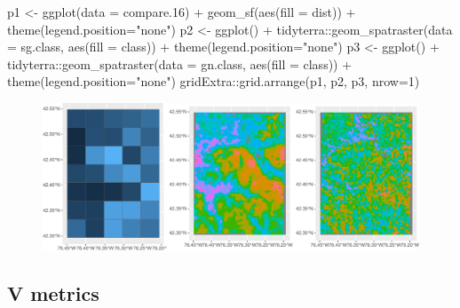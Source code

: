 \documentclass[
  letterpaper,
  DIV=11,
  numbers=noendperiod]{scrartcl}
\newenvironment{Shaded}{\begin{snugshade}}{\end{snugshade}}
\newcommand{\AttributeTok}[1]{\textcolor[rgb]{0.40,0.45,0.13}{#1}}
\newcommand{\DecValTok}[1]{\textcolor[rgb]{0.68,0.00,0.00}{#1}}
\newcommand{\FloatTok}[1]{\textcolor[rgb]{0.68,0.00,0.00}{#1}}
\newcommand{\FunctionTok}[1]{\textcolor[rgb]{0.28,0.35,0.67}{#1}}
\newcommand{\NormalTok}[1]{\textcolor[rgb]{0.00,0.23,0.31}{#1}}
\newcommand{\OtherTok}[1]{\textcolor[rgb]{0.00,0.23,0.31}{#1}}
\newcommand{\SpecialCharTok}[1]{\textcolor[rgb]{0.37,0.37,0.37}{#1}}
\newcommand{\StringTok}[1]{\textcolor[rgb]{0.13,0.47,0.30}{#1}}
\begin{document}
\begin{Shaded}
\begin{Highlighting}[]
\NormalTok{p1 }\OtherTok{\textless{}{-}} \FunctionTok{ggplot}\NormalTok{(}\AttributeTok{data =}\NormalTok{ compare}\FloatTok{.16}\NormalTok{) }\SpecialCharTok{+} 
    \FunctionTok{geom\_sf}\NormalTok{(}\FunctionTok{aes}\NormalTok{(}\AttributeTok{fill =}\NormalTok{ dist))  }\SpecialCharTok{+}
   \FunctionTok{theme}\NormalTok{(}\AttributeTok{legend.position=}\StringTok{"none"}\NormalTok{)}
\NormalTok{p2 }\OtherTok{\textless{}{-}} \FunctionTok{ggplot}\NormalTok{() }\SpecialCharTok{+}
\NormalTok{  tidyterra}\SpecialCharTok{::}\FunctionTok{geom\_spatraster}\NormalTok{(}\AttributeTok{data =}\NormalTok{ sg.class, }\FunctionTok{aes}\NormalTok{(}\AttributeTok{fill =}\NormalTok{ class)) }\SpecialCharTok{+}
   \FunctionTok{theme}\NormalTok{(}\AttributeTok{legend.position=}\StringTok{"none"}\NormalTok{)}
\NormalTok{p3 }\OtherTok{\textless{}{-}} \FunctionTok{ggplot}\NormalTok{() }\SpecialCharTok{+}
\NormalTok{  tidyterra}\SpecialCharTok{::}\FunctionTok{geom\_spatraster}\NormalTok{(}\AttributeTok{data =}\NormalTok{ gn.class, }\FunctionTok{aes}\NormalTok{(}\AttributeTok{fill =}\NormalTok{ class)) }\SpecialCharTok{+}
   \FunctionTok{theme}\NormalTok{(}\AttributeTok{legend.position=}\StringTok{"none"}\NormalTok{)}
\NormalTok{gridExtra}\SpecialCharTok{::}\FunctionTok{grid.arrange}\NormalTok{(p1, p2, p3, }\AttributeTok{nrow=}\DecValTok{1}\NormalTok{)}
\end{Highlighting}
\end{Shaded}

\begin{figure}[H]

{\centering \includegraphics{PatternAnalysisWorkshopTutorial_files/figure-pdf/cove-patterns-plot-1.pdf}

}

\end{figure}

\hypertarget{vmetrics}{%
\subsection{V metrics}\label{vmetrics}}
\end{document}
